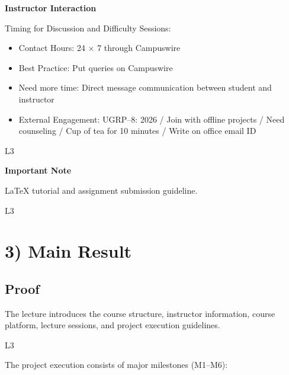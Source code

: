 \documentclass[12pt]{article}
\begin{document}
\textbf{Instructor Interaction}

Timing for Discussion and Difficulty Sessions:

\begin{itemize}
    \item Contact Hours: 24 $\times$ 7 through Campuswire
    \item Best Practice: Put queries on Campuswire
    \item Need more time: Direct message communication between student and instructor
    \item External Engagement: UGRP--8: 2026 / Join with offline projects / Need counseling / Cup of tea for 10 minutes / Write on office email ID
\end{itemize}

L3

\vspace{0.3cm}

\textbf{Important Note}

LaTeX tutorial and assignment submission guideline.

L3


\section*{3) Main Result}

\subsection*{Proof}

The lecture introduces the course structure, instructor information, course platform, lecture sessions, and project execution guidelines.

L3

\vspace{0.3cm}

The project execution consists of major milestones (M1--M6):
\end{document}
